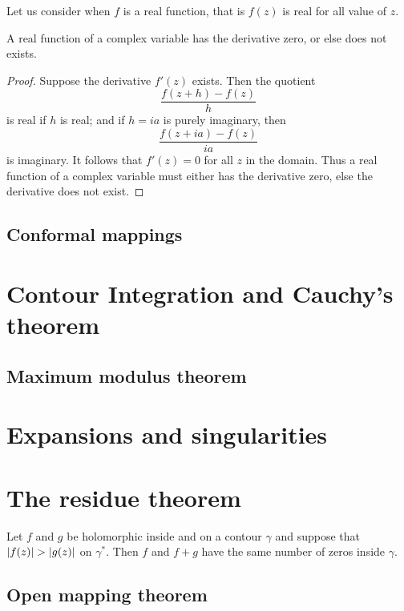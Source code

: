 \documentclass[main.tex]{subfiles}
\begin{document}
	 Let us consider when $f$ is a real function, that is $f(z)$ is real for all value of $z$. 
	\begin{theorem}
		A real function of a complex variable has the derivative zero, or else does not exists.
	\end{theorem}
\begin{proof}
	Suppose the derivative $f'(z)$ exists.
	Then the quotient
		\begin{equation*}
		\frac{f(z + h) - f(z)}{h}
		\end{equation*}
		is real if $h$ is real; and if $h = ia$ is purely imaginary, then
		\begin{equation*}
		\frac{f(z + ia) - f(z)}{ia}
		\end{equation*}
		is imaginary. It follows that $f'(z) = 0$ for all $z$ in the domain. Thus a real function of a complex variable must either has the derivative zero, else the derivative does not exist.
\end{proof}
	
	\subsection{Conformal mappings}
	
	\section{Contour Integration and Cauchy's theorem}
		\subsection{Maximum modulus theorem}
	\section{Expansions and singularities}
		
	\section{The residue theorem}
		\begin{theorem}
			Let $f$ and $g$ be holomorphic inside and on a contour $\gamma$ and suppose that $\lvert f(z)\rvert > \lvert g(z)\rvert$ on $\gamma^\ast$. Then $f$ and $f + g$ have the same number of zeros inside $\gamma$.
		\end{theorem}
	
	\subsection{Open mapping theorem}
		
\end{document}
